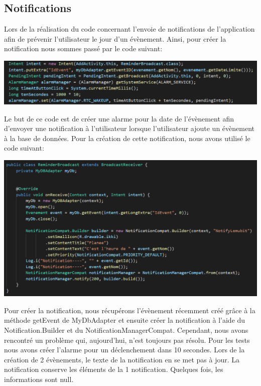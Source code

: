 \documentclass[12pt,a4paper]{report}
\begin{document}
\subsection{Notifications}
\begin{flushleft}
Lors de la réalisation du code concernant l'envoie de notifications de l'application afin de prévenir l'utilisateur le jour d'un évènement. Ainsi, pour créer la notification nous sommes passé par le code suivant:
\center
\begin{minipage}{0.8\linewidth}
\includegraphics[width=\linewidth]{AlarmSet}
\end{minipage}
\justify
Le but de ce code est de créer une alarme pour la date de l'évènement afin d'envoyer une notification à l'utilisateur lorsque l'utilisateur ajoute un évènement à la base de données. Pour la création de cette notification, nous avons utilisé le code suivant: 
\center
\begin{minipage}{0.8\linewidth}
\includegraphics[width=\linewidth]{NotifCode}
\end{minipage}
\justify
Pour créer la notification, nous récupérons l'évènement récemment créé grâce à la méthode getEvent de MyDbAdapter et ensuite créer la notification à l'aide du Notification.Builder et du NotificationManagerCompat. Cependant, nous avons rencontré un problème qui, aujourd'hui, n'est toujours pas résolu. Pour les tests nous avons créer l'alarme pour un déclenchement dans 10 secondes. Lors de la création de 2 évènements, le texte de la notification en se met pas à jour. La notification conserve les éléments de la 1 notification. Quelques fois, les informations sont null.

\end{flushleft}
\end{document}
